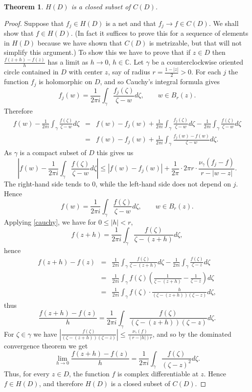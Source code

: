 \documentclass{article}
\newtheorem{theorem}{Theorem}
\begin{document}
\begin{theorem}
$H(D)$ is a closed subset of $C(D)$.
\end{theorem}
\begin{proof}
Suppose that $f_j \in H(D)$ is a net and that $f_j \to f \in C(D)$. We shall show that $f \in H(D)$. (In fact it suffices to prove this for a sequence of elements in $H(D)$ because
we have shown that $C(D)$ is metrizable, but that will not simplify this argument.) To show this we have to prove that if $z \in D$ then $\frac{f(z+h)-f(z)}{h}$ has a limit as $h \to 0$,
$h \in \mathbb{C}$. Let $\gamma$ be a counterclockwise oriented circle contained in $D$ with center $z$, say of radius $r=\frac{1-|z|}{2}>0$. For each $j$ the function $f_j$ is holomorphic on $D$,  and so
Cauchy's integral formula gives
\[
f_j(w)=\frac{1}{2\pi i} \int_\gamma \frac{f_j(\zeta)}{\zeta-w} d\zeta, \qquad w \in B_r(z).
\]
Therefore
\begin{eqnarray*}
f(w)-\frac{1}{2\pi i} \int_\gamma \frac{f(\zeta)}{\zeta-w} d\zeta&=&f(w)-f_j(w)+\frac{1}{2\pi i} \int_\gamma \frac{f_j(\zeta)}{\zeta-w} d\zeta-\frac{1}{2\pi i} \int_\gamma \frac{f(\zeta)}{\zeta-w} d\zeta\\
&=&f(w)-f_j(w)+\frac{1}{2\pi i} \int_\gamma \frac{f_j(w)-f(w)}{\zeta-w} d\zeta.
\end{eqnarray*}
As $\gamma$ is a compact subset of $D$ this gives us
\[
\left| f(w)-\frac{1}{2\pi i} \int_\gamma \frac{f(\zeta)}{\zeta-w} d\zeta \right| \leq |f(w)-f_j(w)|+ \frac{1}{2\pi}\cdot 2\pi r \cdot \frac{\nu_\gamma(f_j-f)}{r-|w-z|}.
\]
The right-hand side tends to 0, while the left-hand side does not depend on $j$. Hence 
\begin{equation}
f(w)=\frac{1}{2\pi i} \int_\gamma \frac{f(\zeta)}{\zeta-w} d\zeta, \qquad w \in B_r(z).
\label{cauchy}
\end{equation}
Applying \eqref{cauchy}, we have for $0 \leq |h|<r$,
\[
f(z+h)=\frac{1}{2\pi i} \int_\gamma \frac{f(\zeta)}{\zeta-(z+h)} d\zeta,
\]
hence
\begin{eqnarray*}
f(z+h)-f(z)&=&\frac{1}{2\pi i} \int_\gamma \frac{f(\zeta)}{\zeta-(z+h)} d\zeta- \frac{1}{2\pi i} \int_\gamma \frac{f(\zeta)}{\zeta-z} d\zeta\\
&=&\frac{1}{2\pi i} \int_\gamma f(\zeta)\left( \frac{1}{\zeta-(z+h)} - \frac{1}{\zeta-z} \right) d\zeta\\
&=&\frac{1}{2\pi i}\int_\gamma f(\zeta) \cdot \frac{h}{(\zeta-(z+h))(\zeta-z)} d\zeta,
\end{eqnarray*}
thus
\[
\frac{f(z+h)-f(z)}{h} = \frac{1}{2\pi i} \int_\gamma \frac{f(\zeta)}{(\zeta-(z+h))(\zeta-z)} d\zeta.
\]
For $\zeta \in \gamma$ we have $\left| \frac{f(\zeta)}{(\zeta-(z+h))(\zeta-z)} \right| \leq \frac{\nu_\gamma(f)}{(r-|h|)r}$, and so by the dominated convergence theorem we get
\[
\lim_{h \to 0} \frac{f(z+h)-f(z)}{h} = \frac{1}{2\pi i} \int_\gamma \frac{f(\zeta)}{(\zeta-z)^2} d\zeta.
\]
Thus, for every $z \in D$, the function $f$ is complex differentiable at $z$. Hence $f \in H(D)$, and therefore $H(D)$ is  a closed subset of $C(D)$. 
\end{proof}
\end{document}
